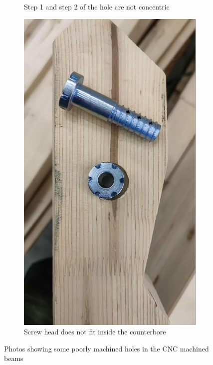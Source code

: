 \begin{figure}[!h]
\begin{subfigure}[b]{0.49\textwidth}
        \caption{Step 1 and step 2 of the hole are not concentric}
    \end{subfigure}
    \hfill
    \begin{subfigure}[b]{0.49\textwidth}
        \centering
        \includegraphics[width=\textwidth]{images/7b/img70.jpg}
        \caption{Screw head does not fit inside the counterbore}
    \end{subfigure}
    \caption{Photos showing some poorly machined holes in the CNC machined beams}
    \label{fig:poorly-machined-holes}
\end{figure}

